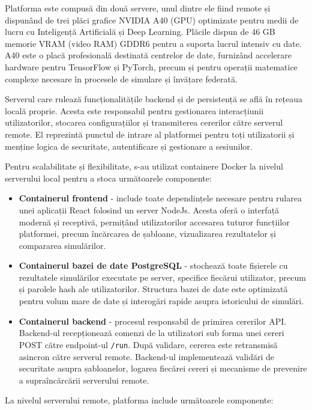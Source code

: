 \documentclass[../../main.tex]{subfiles}
\begin{document}
	    Platforma este compusă din două servere, unul dintre ele fiind remote și dispunând de trei plăci grafice NVIDIA A40 (GPU) optimizate pentru medii de lucru cu Inteligență Artificială și Deep Learning. Plăcile dispun de 46 GB memorie VRAM (video RAM) GDDR6 pentru a suporta lucrul intensiv cu date. A40 este o placă profesională destinată centrelor de date, furnizând accelerare hardware pentru TensorFlow și PyTorch, precum și pentru operații matematice complexe necesare în procesele de simulare și învățare federată.

	    Serverul care rulează funcționalitățile backend și de persistență se află în rețeaua locală proprie. Acesta este responsabil pentru gestionarea interacțiunii utilizatorilor, stocarea configurațiilor și transmiterea cererilor către serverul remote. El reprezintă punctul de intrare al platformei pentru toți utilizatorii și menține logica de securitate, autentificare și gestionare a sesiunilor.
    
    Pentru scalabilitate și flexibilitate, s-au utilizat containere Docker la nivelul serverului local pentru a stoca următoarele componente:

    \begin{itemize}
        \item \textbf{Containerul frontend} - include toate dependințele necesare pentru rularea unei aplicații React folosind un server NodeJs. Acesta oferă o interfață modernă și receptivă, permițând utilizatorilor accesarea tuturor funcțiilor platformei, precum încărcarea de șabloane, vizualizarea rezultatelor și compararea simulărilor.
        \item \textbf{Containerul bazei de date PostgreSQL} - stochează toate fișierele cu rezultatele simulărilor executate pe server, specifice fiecărui utilizator, precum și parolele hash ale utilizatorilor. Structura bazei de date este optimizată pentru volum mare de date și interogări rapide asupra istoricului de simulări.
        \item \textbf{Containerul backend} - procesul responsabil de primirea cererilor API. Backend-ul recep\-ționează comenzi de la utilizatori sub forma unei cereri POST către endpoint-ul \texttt{/run}. După validare, cererea este retransmisă asincron către serverul remote. Backend-ul implementează validări de securitate asupra șabloanelor, logarea fiecărei cereri și mecanisme de prevenire a supraîncărcării serverului remote.
    \end{itemize}

    La nivelul serverului remote, platforma include următoarele componente:
\end{document}
